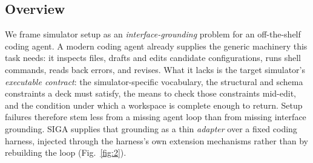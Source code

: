 \documentclass{article}
\begin{document}



\subsection{Overview}
\label{subsec:method-overview}

We frame simulator setup as an \emph{interface-grounding} problem for an off-the-shelf coding agent. A modern coding agent already supplies the generic machinery this task needs: it inspects files, drafts and edits candidate configurations, runs shell commands, reads back errors, and revises. What it lacks is the target simulator's \emph{executable contract}: the simulator-specific vocabulary, the structural and schema constraints a deck must satisfy, the means to check those constraints mid-edit, and the condition under which a workspace is complete enough to return. Setup failures therefore stem less from a missing agent loop than from missing interface grounding. SIGA supplies that grounding as a thin \emph{adapter} over a fixed coding harness, injected through the harness's own extension mechanisms rather than by rebuilding the loop (Fig.~\ref{fig:2}).
\end{document}
